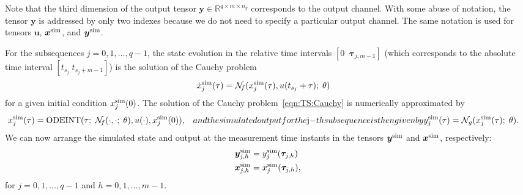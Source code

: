 \documentclass{article} %
\newcommand{\NN}{\mathcal{N}} %
\newcommand{\batchsize}{q}
\newcommand{\seqlen}{m}
\newcommand{\tens}[1]{\bm{#1}}
\newcommand{\simul}[1]{{#1}^{\rm sim}}
\newcommand{\est}{}
\begin{document}
Note that the third dimension of the output tensor $\tens{y} \in \mathbb{R}^{\batchsize \times \seqlen \times n_y}$ corresponds to the output channel. With some abuse of notation, the tensor $\tens{y}$ is addressed by only two indexes  because we do not need to specify a particular output channel. The same notation is used for tensors $\tens{u}$, $\simul{\tens{x}}$, 
and $\simul{\est{{\tens{y}}}}$.  

For the subsequences $ j=0,1,\dots,\batchsize-1$, the state evolution  in the relative time intervals $[0\; \;  \tens{\tau}_{j, \seqlen-1}]$ (which corresponds to the absolute time interval $[t_{s_j}\; t_{s_j+\seqlen-1}]$) is the solution of the Cauchy problem 
\begin{align} \label{eqn:TS:Cauchy}
\simul{{\dot x}}_{j}(\tau) &= \NN_{\!f}(\simul{{x}}_{j}(\tau), u(t_{s_j} + \tau);\;\theta)
\end{align}
for a given initial condition $\simul{{x}}_{j}(0)$. The solution of the Cauchy problem~\eqref{eqn:TS:Cauchy} 
is numerically  approximated by 
\begin{subequations}
\begin{align} \label{eqn_ODEint}
\simul{{x}}_{j}(\tau) &= \text{ODEINT}(\tau;\; \NN_{\!f}(\cdot, \cdot;\; \theta), u(\cdot), \simul{{x}}_{j}(0)),
\end{align}
and the simulated output for the $j$-th subsequence is then given by
\begin{align} \label{eqn:xsim}
    \simul{\est{{y}}}_j(\tau) &= \NN_{g}( \simul{{x}}_{j}(\tau);\; \theta).
\end{align}
\end{subequations}
We can now arrange the simulated state and output at the measurement time instants in the tensors 
$\simul{\est{\tens{y}}}$ and $\simul{\tens{x}}$, respectively:
\begin{subequations}
\begin{align}
 \simul{\est{\tens{y}}}_{j,h} &= \simul{\est y}_j(\tens{\tau}_{j,h})\\
 \simul{{\tens{x}}}_{j,h}     &= \simul{x}_j(\tens{\tau}_{j,h}),
 \end{align}
\end{subequations}
for $j=0,1,\dots,\batchsize-1$ and $h=0,1,\dots,\seqlen-1$. 
\end{document}
